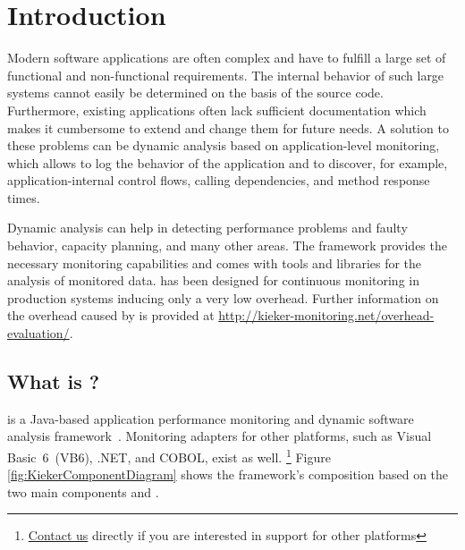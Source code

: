 %


\chapter{Introduction}\label{chap:introduction}

Modern software applications are often complex and have to fulfill a large set of functional and non-functional requirements. The internal behavior of such large systems cannot easily be determined on the basis of the source code. Furthermore, existing applications often lack sufficient documentation which makes it cumbersome to extend and change them for future needs. A solution to these problems can be dynamic analysis based on application-level monitoring, which allows to log the behavior of the application and to discover, for example, application-internal control flows, calling dependencies, and method response times.

Dynamic analysis can help in detecting performance problems and faulty behavior, capacity planning, and many other areas. The \Kieker{} framework provides the necessary monitoring capabilities and comes with tools and libraries for the analysis of monitored data. \Kieker{} has been designed for %
continuous monitoring in production systems inducing only a very low overhead. Further information on the overhead caused by \Kieker{} is provided at \url{http://kieker-monitoring.net/overhead-evaluation/}.

\section{What is \Kieker?}\label{sec:kieker}

\enlargethispage{1cm}

\Kieker{} is a Java-based application performance monitoring and dynamic software analysis framework~\cite{KiekerICPE2012}. %
Monitoring adapters for other platforms, such as Visual Basic~6~(VB6), .NET, and COBOL, exist as well.%
\footnote{\href{http://kieker-monitoring.net/support/}{Contact us} directly if you are interested in \Kieker{} support for other platforms} %
Figure \ref{fig:KiekerComponentDiagram} shows the framework's composition based %
on the two main components \KiekerMonitoringPart{} and \KiekerAnalysisPart{}. %

